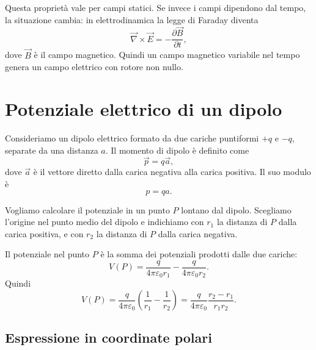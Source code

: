 \documentclass[a4paper]{article}
\begin{document}
Questa proprietà vale per campi statici. Se invece i campi dipendono dal tempo, la situazione cambia: in elettrodinamica la legge di Faraday diventa
\[
    \vec{\nabla}\times\vec{E}=-\frac{\partial\vec{B}}{\partial t},
\]
dove \(\vec{B}\) è il campo magnetico. Quindi un campo magnetico variabile nel tempo genera un campo elettrico con rotore non nullo.

\section{Potenziale elettrico di un dipolo}

Consideriamo un dipolo elettrico formato da due cariche puntiformi \(+q\) e \(-q\), separate da una distanza \(a\). Il momento di dipolo è definito come
\[
    \vec{p}=q\vec{a},
\]
dove \(\vec{a}\) è il vettore diretto dalla carica negativa alla carica positiva. Il suo modulo è
\[
    p=qa.
\]

Vogliamo calcolare il potenziale in un punto \(P\) lontano dal dipolo. Scegliamo l'origine nel punto medio del dipolo e indichiamo con \(r_1\) la distanza di \(P\) dalla carica positiva, e con \(r_2\) la distanza di \(P\) dalla carica negativa.

\begin{center}
\end{center}

Il potenziale nel punto \(P\) è la somma dei potenziali prodotti dalle due cariche:
\[
    V(P)=\frac{q}{4\pi\varepsilon_0r_1}-\frac{q}{4\pi\varepsilon_0r_2}.
\]
Quindi
\[
    V(P)=\frac{q}{4\pi\varepsilon_0}\left(\frac{1}{r_1}-\frac{1}{r_2}\right)
    =\frac{q}{4\pi\varepsilon_0}\frac{r_2-r_1}{r_1r_2}.
\]

\subsection{Espressione in coordinate polari}
\end{document}
